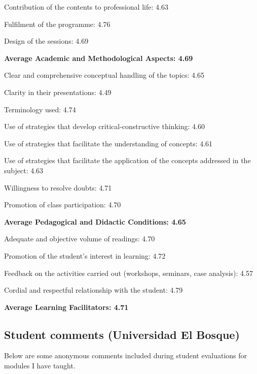 \documentclass[11pt, a4paper]{awesome-cv}
\begin{document}
\begin{cventries}
{\begin{cvitems}
\item Contribution of the contents to professional life: 4.63
\item Fulfilment of the programme: 4.76
\item Design of the sessions: 4.69
\item \textbf{ Average Academic and Methodological Aspects: 4.69}
\item Clear and comprehensive conceptual handling of the topics: 4.65
\item Clarity in their presentations: 4.49
\item Terminology used: 4.74
\item Use of strategies that develop critical-constructive thinking: 4.60
\item Use of strategies that facilitate the understanding of concepts: 4.61
\item Use of strategies that facilitate the application of the concepts addressed in the subject: 4.63
\item Willingness to resolve doubts: 4.71
\item Promotion of class participation: 4.70
\item \textbf{ Average Pedagogical and Didactic Conditions: 4.65}
\item Adequate and objective volume of readings: 4.70
\item Promotion of the student's interest in learning: 4.72
\item Feedback on the activities carried out (workshops, seminars, case analysis): 4.57
\item Cordial and respectful relationship with the student: 4.79
\item \textbf{Average Learning Facilitators: 4.71}
\end{cvitems}}
\end{cventries}

\hypertarget{universidad-el-bosque-1}{%
\subsection{\texorpdfstring{\textbf{Student comments} (Universidad El
Bosque)}{ (Universidad El Bosque)}}\label{universidad-el-bosque-1}}

Below are some anonymous comments included during student evaluations
for modules I have taught.
\end{document}
